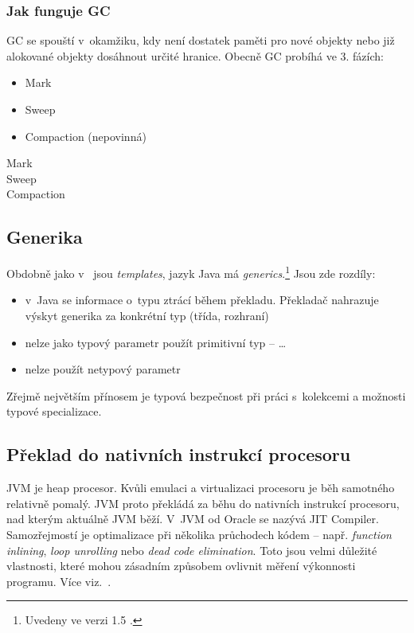 \subsubsection{Jak funguje GC}
GC se spouští v~okamžiku, kdy není dostatek paměti pro nové objekty nebo již alokované objekty dosáhnout určité hranice. Obecně GC probíhá ve 3. fázích:
\begin{itemize}
  \item Mark
  \item Sweep
  \item Compaction (nepovinná)
\end{itemize}

\begin{description}
  \item[Mark] 
  \item[Sweep] 
  \item[Compaction] 
\end{description}

\subsection{Generika\label{sub:generika}}

Obdobně jako v~\CC{} jsou \emph{templates}\cite{ISO:2012:CPP}, jazyk Java má \emph{generics}.\footnote{Uvedeny ve verzi 1.5 \cite{gosling2013java}.}
Jsou zde rozdíly:
\begin{itemize}
  \item v~Java se informace o~typu ztrácí během překladu. Překladač nahrazuje výskyt generika za konkrétní typ (třída, rozhraní)
  \item nelze jako typový parametr použít primitivní typ --  \ldots{}
  \item nelze použít netypový parametr
\end{itemize}

Zřejmě největším přínosem je typová bezpečnost při práci s~kolekcemi a možnosti typové specializace.

\subsection{Překlad \bytecode{} do nativních instrukcí procesoru}

JVM je heap procesor. Kvůli emulaci a virtualizaci procesoru je
běh samotného \bytecode{} relativně pomalý. JVM proto překládá
za běhu \bytecode{} do nativních instrukcí procesoru, nad kterým
aktuálně JVM běží. V~JVM od Oracle
 se nazývá JIT Compiler\cite{hunt2011java}. Samozřejmostí je optimalizace při několika průchodech
kódem -- např. \emph{function inlining}, \emph{loop unrolling} nebo \emph{dead code elimination}\cite{hunt2011java}. Toto jsou velmi důležité vlastnosti, které mohou zásadním způsobem
ovlivnit měření výkonnosti programu. Více viz.~.


